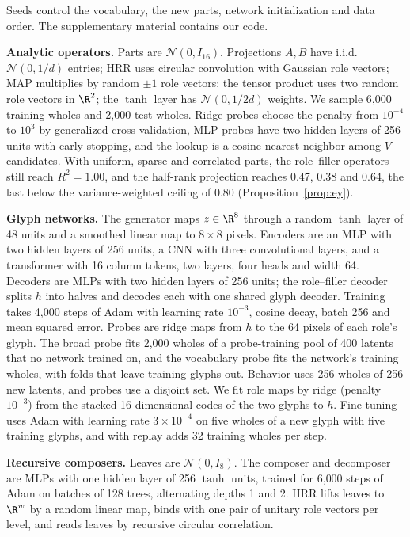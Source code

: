 Seeds control the vocabulary, the new parts, network initialization and data order. The supplementary material contains our code.

\textbf{Analytic operators.} Parts are $\mathcal{N}(0, I_{16})$. Projections $A, B$ have i.i.d.\ $\mathcal{N}(0, 1/d)$ entries; HRR uses circular convolution with Gaussian role vectors; MAP multiplies by random $\pm 1$ role vectors; the tensor product uses two random role vectors in $\R^2$; the $\tanh$ layer has $\mathcal{N}(0, 1/2d)$ weights. We sample 6{,}000 training wholes and 2{,}000 test wholes. Ridge probes choose the penalty from $10^{-4}$ to $10^{3}$ by generalized cross-validation, MLP probes have two hidden layers of 256 units with early stopping, and the lookup is a cosine nearest neighbor among $V$ candidates. With uniform, sparse and correlated parts, the role--filler operators still reach $R^2 = 1.00$, and the half-rank projection reaches 0.47, 0.38 and 0.64, the last below the variance-weighted ceiling of 0.80 (Proposition~\ref{prop:ey}).

\textbf{Glyph networks.} The generator maps $z \in \R^8$ through a random $\tanh$ layer of 48 units and a smoothed linear map to $8 \times 8$ pixels. Encoders are an MLP with two hidden layers of 256 units, a CNN with three convolutional layers, and a transformer with 16 column tokens, two layers, four heads and width 64. Decoders are MLPs with two hidden layers of 256 units; the role--filler decoder splits $h$ into halves and decodes each with one shared glyph decoder. Training takes 4{,}000 steps of Adam with learning rate $10^{-3}$, cosine decay, batch 256 and mean squared error. Probes are ridge maps from $h$ to the 64 pixels of each role's glyph. The broad probe fits 2{,}000 wholes of a probe-training pool of 400 latents that no network trained on, and the vocabulary probe fits the network's training wholes, with folds that leave training glyphs out. Behavior uses 256 wholes of 256 new latents, and probes use a disjoint set. We fit role maps by ridge (penalty $10^{-3}$) from the stacked 16-dimensional codes of the two glyphs to $h$. Fine-tuning uses Adam with learning rate $3 \times 10^{-4}$ on five wholes of a new glyph with five training glyphs, and with replay adds 32 training wholes per step.

\textbf{Recursive composers.} Leaves are $\mathcal{N}(0, I_8)$. The composer and decomposer are MLPs with one hidden layer of 256 $\tanh$ units, trained for 6{,}000 steps of Adam on batches of 128 trees, alternating depths 1 and 2. HRR lifts leaves to $\R^w$ by a random linear map, binds with one pair of unitary role vectors per level, and reads leaves by recursive circular correlation.

